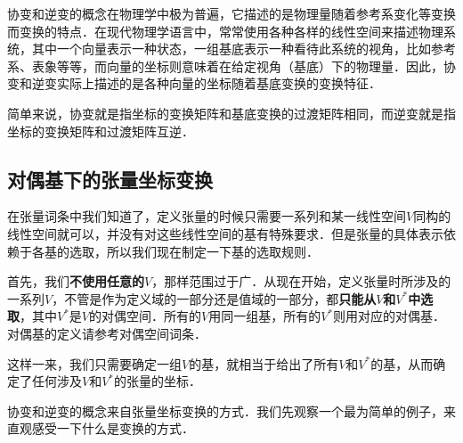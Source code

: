 


协变和逆变的概念在物理学中极为普遍，它描述的是物理量随着参考系变化等变换而变换的特点．在现代物理学语言中，常常使用各种各样的线性空间来描述物理系统，其中一个向量表示一种状态，一组基底表示一种看待此系统的视角，比如参考系、表象等等，而向量的坐标则意味着在给定视角（基底）下的物理量．因此，协变和逆变实际上描述的是各种向量的坐标随着基底变换的变换特征．

简单来说，协变就是指坐标的变换矩阵和基底变换的过渡矩阵相同，而逆变就是指坐标的变换矩阵和过渡矩阵互逆．

\subsection{对偶基下的张量坐标变换}

在张量词条中我们知道了，定义张量的时候只需要一系列和某一线性空间$V$同构的线性空间就可以，并没有对这些线性空间的基有特殊要求．但是张量的具体表示依赖于各基的选取，所以我们现在制定一下基的选取规则．

首先，我们\textbf{不使用任意的}$V$，那样范围过于广．从现在开始，定义张量时所涉及的一系列$V$，不管是作为定义域的一部分还是值域的一部分，都\textbf{只能从}$V$\textbf{和}$V^*$\textbf{中选取}，其中$V^*$是$V$的对偶空间．所有的$V$用同一组基，所有的$V^*$则用对应的对偶基．对偶基的定义请参考对偶空间词条．

这样一来，我们只需要确定一组$V$的基，就相当于给出了所有$V$和$V^*$的基，从而确定了任何涉及$V$和$V^*$的张量的坐标．



协变和逆变的概念来自张量坐标变换的方式．我们先观察一个最为简单的例子，来直观感受一下什么是变换的方式．

